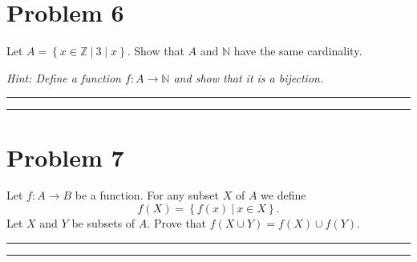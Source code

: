 \documentclass{article}
\theoremstyle{definition}
\newenvironment{solution}{\bigskip\hrule{\hfill}}{\bigskip\hrule{\hfill}} %
\begin{document}

\newpage


\section*{Problem 6}
Let $A=\left\{x\in\mathbb{Z}~\big\vert~3\mid x\right\}$. Show that $A$ and $\mathbb{N}$ have the same cardinality. \medskip

\emph{Hint: Define a function $f:A\longrightarrow\mathbb{N}$ and show that it is a bijection.}
\begin{solution}


\end{solution}


\newpage


\section*{Problem 7}
Let $f:A\longrightarrow B$ be a function. For any subset $X$ of $A$ we define $$f\left(X\right)=\left\{f\left(x\right)~\big\vert~x\in X\right\}.$$ Let $X$ and $Y$ be subsets of $A$. Prove that $f\left(X\cup Y\right)=f\left(X\right)\cup f\left(Y\right)$.
\begin{solution}


\end{solution}


\newpage

\end{document}
